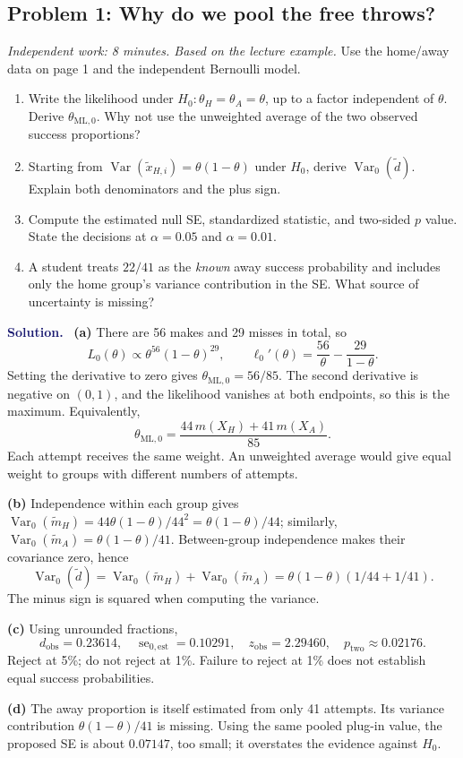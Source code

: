 \documentclass[11pt]{article}
\newcommand{\rv}[1]{\widetilde{#1}}
\newcommand{\Var}{\operatorname{Var}}
\newcommand{\se}{\operatorname{se}}
\newenvironment{answer}{\par\medskip\noindent\textcolor{MidnightBlue}{\textbf{Solution.}}\ }{\par\medskip}
\newcommand{\workingspace}[1]{}
\newcommand{\workingspace}[1]{\vspace{#1}}
\begin{document}
\subsection*{Problem 1: Why do we pool the free throws?}
\noindent\textit{Independent work: 8 minutes. Based on the lecture example.}
Use the home/away data on page 1 and the independent Bernoulli model.
\begin{enumerate}
 \item Write the likelihood under $H_0:\theta_H=\theta_A=\theta$, up to a
 factor independent of $\theta$. Derive $\theta_{\mathrm{ML},0}$.
 Why not use the unweighted average of the two observed success proportions?
 \item Starting from $\Var(\rv x_{H,i})=\theta(1-\theta)$ under $H_0$,
 derive $\Var_0(\rv d)$. Explain both denominators and the plus sign.
 \item Compute the estimated null SE, standardized statistic, and two-sided
 $p$ value. State the decisions at $\alpha=0.05$ and $\alpha=0.01$.
 \item A student treats $22/41$ as the \emph{known} away success probability
 and includes only the home group's variance contribution in the SE.
 What source of uncertainty is missing?
\end{enumerate}
\workingspace{9cm}
\begin{answer}
\textbf{(a)} There are 56 makes and 29 misses in total, so
\[
 L_0(\theta)\propto\theta^{56}(1-\theta)^{29},\qquad
 \ell_0'(\theta)=\frac{56}{\theta}-\frac{29}{1-\theta}.
\]
Setting the derivative to zero gives
$\boxed{\theta_{\mathrm{ML},0}=56/85}$.
The second derivative is negative on $(0,1)$, and the likelihood vanishes
at both endpoints, so this is the maximum. Equivalently,
\[
 \theta_{\mathrm{ML},0}
 =\frac{44\,m(X_H)+41\,m(X_A)}{85}.
\]
Each attempt receives the same weight. An unweighted average would give
equal weight to groups with different numbers of attempts.

\textbf{(b)} Independence within each group gives
$\Var_0(\rv m_H)=44\theta(1-\theta)/44^2=\theta(1-\theta)/44$;
similarly, $\Var_0(\rv m_A)=\theta(1-\theta)/41$.
Between-group independence makes their covariance zero, hence
\[
 \boxed{\Var_0(\rv d)=\Var_0(\rv m_H)+\Var_0(\rv m_A)
 =\theta(1-\theta)(1/44+1/41).}
\]
The minus sign is squared when computing the variance.

\textbf{(c)} Using unrounded fractions,
\[
 d_{\mathrm{obs}}=0.23614,\quad \se_{0,\mathrm{est}}=0.10291,\quad
 z_{\mathrm{obs}}=2.29460,\quad p_{\mathrm{two}}\approx0.02176.
\]
Reject at 5\%; do not reject at 1\%. Failure to reject at 1\% does not
establish equal success probabilities.

\textbf{(d)} The away proportion is itself estimated from only 41 attempts.
Its variance contribution $\theta(1-\theta)/41$ is missing. Using the same
pooled plug-in value, the proposed SE is about $0.07147$, too small; it
overstates the evidence against $H_0$.
\end{answer}
\end{document}
